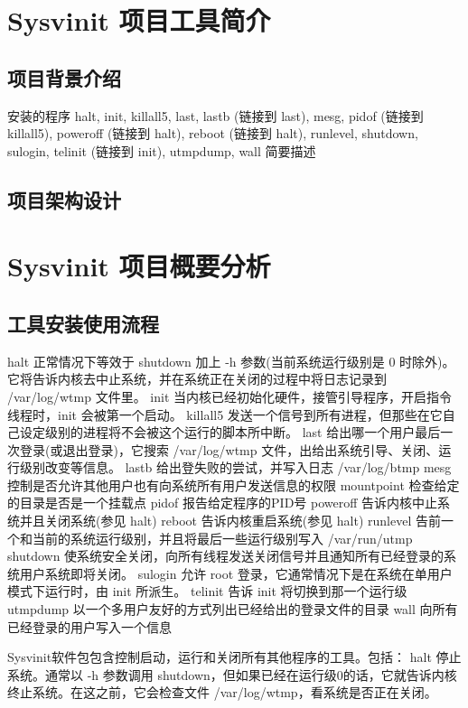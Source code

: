 \chapter{Sysvinit 项目工具简介}

\section{项目背景介绍}

安装的程序 halt, init, killall5, last, lastb (链接到 last), mesg, pidof
(链接到 killall5), poweroff (链接到 halt), reboot (链接到 halt),
runlevel, shutdown, sulogin, telinit (链接到 init), utmpdump, wall
简要描述

\section{项目架构设计}

\chapter{Sysvinit 项目概要分析}

\section{工具安装使用流程}

halt 正常情况下等效于 shutdown 加上 -h 参数(当前系统运行级别是 0
时除外)。它将告诉内核去中止系统，并在系统正在关闭的过程中将日志记录到
/var/log/wtmp 文件里。 init
当内核已经初始化硬件，接管引导程序，开启指令线程时，init 会被第一个启动。
killall5
发送一个信号到所有进程，但那些在它自己设定级别的进程将不会被这个运行的脚本所中断。
last 给出哪一个用户最后一次登录(或退出登录)，它搜索 /var/log/wtmp
文件，出给出系统引导、关闭、运行级别改变等信息。 lastb
给出登失败的尝试，并写入日志 /var/log/btmp mesg
控制是否允许其他用户也有向系统所有用户发送信息的权限 mountpoint
检查给定的目录是否是一个挂载点 pidof 报告给定程序的PID号 poweroff
告诉内核中止系统并且关闭系统(参见 halt) reboot 告诉内核重启系统(参见
halt) runlevel 告前一个和当前的系统运行级别，并且将最后一些运行级别写入
/var/run/utmp shutdown
使系统安全关闭，向所有线程发送关闭信号并且通知所有已经登录的系统用户系统即将关闭。
sulogin 允许 root 登录，它通常情况下是在系统在单用户模式下运行时，由 init
所派生。 telinit 告诉 init 将切换到那一个运行级 utmpdump
以一个多用户友好的方式列出已经给出的登录文件的目录 wall
向所有已经登录的用户写入一个信息

Sysvinit软件包包含控制启动，运行和关闭所有其他程序的工具。包括： halt
停止系统。通常以 -h 参数调用
shutdown，但如果已经在运行级0的话，它就告诉内核终止系统。在这之前，它会检查文件
/var/log/wtmp，看系统是否正在关闭。

